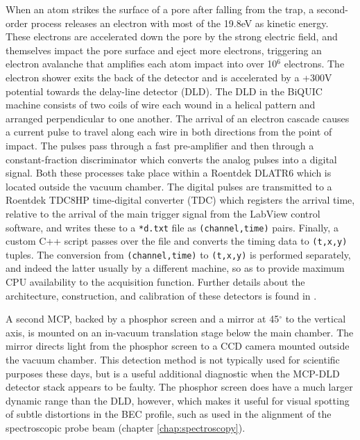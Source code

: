 	

	When an atom strikes the surface of a pore after falling from the trap, a second-order process releases an electron with most of the  19.8eV as kinetic energy\cite{ThatPaper}.
	These electrons are accelerated down the pore by the strong electric field, and themselves impact the pore surface and eject more electrons, triggering an electron avalanche that amplifies each atom impact into over 10$^6$ electrons.
	The electron shower exits the back of the detector and is accelerated by a +300V potential towards the delay-line detector (DLD).
	The DLD in the BiQUIC machine consists of two coils of wire each wound in a helical pattern and arranged perpendicular to one another.
	 The arrival of an electron cascade causes a current pulse to travel along each wire in both directions from the point of impact.
	The pulses pass through a fast pre-amplifier and then through a constant-fraction discriminator which converts the analog pulses into a digital signal.
	Both these processes take place within a Roentdek DLATR6 which is located outside the vacuum chamber.
	The digital pulses are transmitted to a Roentdek TDC8HP time-digital converter (TDC) which registers the arrival time, relative to the arrival of the main trigger signal from the LabView control software, and writes these to a \verb|*d.txt| file as \verb|(channel,time)| pairs.
	Finally, a custom C++ script passes over the file and converts the timing data to \verb|(t,x,y)| tuples.
	The conversion from \verb|(channel,time)| to \verb|(t,x,y)| is performed separately, and indeed the latter usually by a different machine, so as to provide maximum CPU availability to the acquisition function.	Further details about the architecture, construction, and calibration of these detectors is found in \cite{HodgmanThesis,ManningThesis}.

	A second MCP, backed by a phosphor screen and a mirror at 45$^\circ$ to the vertical axis, is mounted on an in-vacuum translation stage below the main chamber.
	The mirror directs light from the phosphor screen to a CCD camera mounted outside the vacuum chamber.
	This detection method is not typically used for scientific purposes these days, but is a useful additional diagnostic when the MCP-DLD detector stack appears to be faulty.
	The phosphor screen does have a much larger dynamic range than the DLD, however, which makes it useful for visual spotting of subtle distortions in the BEC profile, such as used in the alignment of the spectroscopic probe beam (chapter \ref{chap:spectroscopy}).
	


